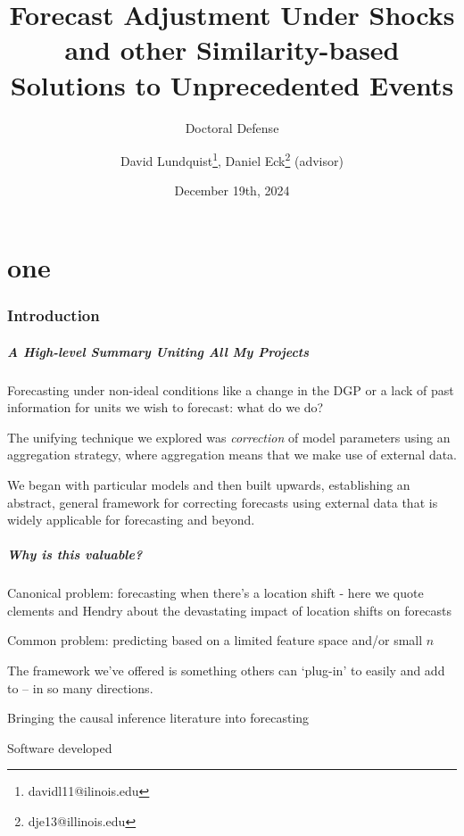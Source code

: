 \documentclass[9pt]{beamer}
\title{Forecast Adjustment Under Shocks and other Similarity-based Solutions to Unprecedented Events}
\subtitle{Doctoral Defense}
\author{David Lundquist\thanks{davidl11@ilinois.edu}, Daniel Eck\thanks{dje13@illinois.edu} (advisor)}
\date{December 19th, 2024}
\theoremstyle{definition}
\begin{document}
\part{one}
\begin{frame}
\titlepage
\end{frame}

\section{Introduction}

\begin{frame}
    \frametitle{A High-level Summary Uniting All My Projects}
    
        Forecasting under non-ideal conditions like a change in the DGP or a lack of past information for units we wish to forecast: what do we do?

        \bigskip

        The unifying technique we explored was \textit{correction} of model parameters using an aggregation strategy, where aggregation means that we make use of external data.\\

        \bigskip


        We began with particular models and then built upwards, establishing an abstract, general framework for correcting forecasts using external data that is widely applicable for forecasting and beyond.

    \end{frame}

    \begin{frame}
        \frametitle{Why is this valuable?}
        
            Canonical problem: forecasting when there's a location shift - here we quote clements and Hendry about the devastating impact of location shifts on forecasts
    
            \bigskip
    
            Common problem: predicting based on a limited feature space and/or small $n$
    
            \bigskip

            The framework we've offered is something others can `plug-in' to easily and add to -- in so many directions.

            \bigskip

            Bringing the causal inference literature into forecasting

            \bigskip

            Software developed

        \end{frame}
\end{document}
